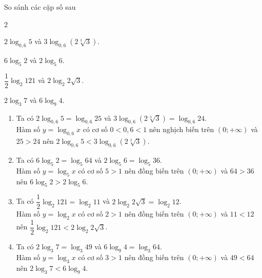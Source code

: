 \begin{bt}
	So sánh các cặp số sau
	\begin{enumEX}[a)]{2}
		\item $2 \log _{0{,}6} 5$ và $3 \log _{0{,}6}(2 \sqrt[3]{3})$.
		\item $6 \log _5 2$ và $2 \log _5 6$.
		\item $\dfrac{1}{2} \log _2 121$ và $2 \log _2 2 \sqrt{3}$.
		\item $2 \log _3 7$ và $6 \log _9 4$.
	\end{enumEX}
	\loigiai
	{
		\begin{enumerate}
			\item Ta có $2 \log_{0{,}6} 5=\log_{0{,}6}25$ và $3 \log _{0{,}6}(2 \sqrt[3]{3}) = \log_{0{,}6}24$.\\
			Hàm số $y = \log_{0{,}6}x$ có cơ số $0<0{,}6<1$ nên nghịch biến trên $(0;+\infty)$ và $25>24$ nên $2 \log _{0{,}6} 5<3 \log _{0{,}6}(2 \sqrt[3]{3})$.
			\item Ta có $6 \log _5 2=\log_5 64$ và $2 \log _5 6=\log_5 36$.\\
			Hàm số $y=\log_5x$ có cơ số $5>1$ nên đồng biến trên $(0;+\infty)$ và $64>36$ nên $6 \log _5 2>2 \log _5 6$.
			\item Ta có $\dfrac{1}{2} \log _2 121=\log_2 11$ và $2 \log _2 2 \sqrt{3}=\log_2 12$.\\
			Hàm số $y = \log_2x$ có cơ số $2>1$ nên đồng biến trên $(0;+\infty)$ và $11<12$ nên $\dfrac{1}{2} \log _2 121<2 \log _2 2 \sqrt{3}$.
			\item Ta có $2 \log _3 7=\log_3 49$ và $6 \log _9 4=\log_3 64$.\\
			Hàm số $y = \log_3 x$ có cơ số $3>1$ nên đồng biến trên $(0;+\infty)$ và $ 49<64$ nên $2 \log _3 7<6 \log _9 4$.
		\end{enumerate}
	}
\end{bt} 

